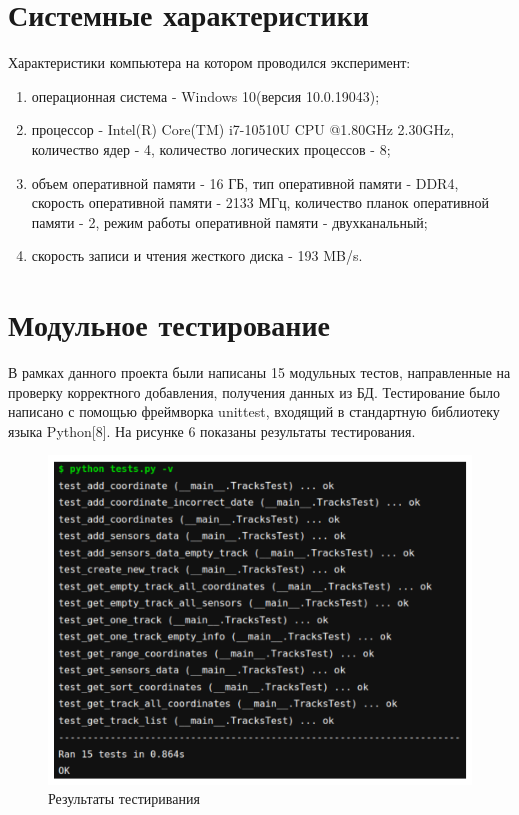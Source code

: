 \documentclass[a4paper, 10pt]{article}
\begin{document}
	\section{Системные характеристики}
	Характеристики компьютера на котором проводился эксперимент:
	\begin{enumerate}
		\item операционная система - Windows 10(версия 10.0.19043);
		\item процессор - Intel(R) Core(TM) i7-10510U CPU @1.80GHz 2.30GHz, количество ядер - 4, количество логических процессов - 8;
		\item объем оперативной памяти - 16 ГБ, тип оперативной памяти - DDR4, скорость оперативной памяти - 2133 МГц, количество планок оперативной памяти - 2, режим работы оперативной памяти - двухканальный;
		\item скорость записи и чтения жесткого диска - 193 MB/s.
	\end{enumerate} 
	
	\section{Модульное тестирование}
	\hspace*{5mm} В рамках данного проекта были написаны 15 модульных тестов, направленные на проверку корректного добавления, получения данных из БД. Тестирование было написано с помощью фреймворка unittest, входящий в стандартную библиотеку языка Python[8]. На рисунке 6 показаны результаты тестирования.
		\begin{figure}[h!]
		\centering
		\includegraphics[scale=1.4]{tests}
		\centering\caption{Результаты тестиривания}
	\end{figure}
\end{document}
